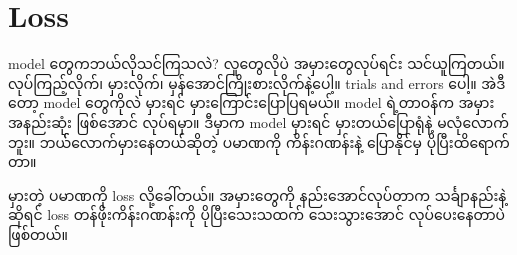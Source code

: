 \section{Loss}

model တွေကဘယ်လိုသင်ကြသလဲ? လူတွေလိုပဲ အမှားတွေလုပ်ရင်း သင်ယူကြတယ်။
လုပ်ကြည့်လိုက်၊ မှားလိုက်၊ မှန်အောင်ကြိုးစားလိုက်နဲ့ပေါ့။ trials and errors ပေါ့။
အဲဒီတော့ model တွေကိုလဲ မှားရင် မှားကြောင်းပြောပြရမယ်။ model ရဲ့တာဝန်က အမှားအနည်းဆုံး
ဖြစ်အောင် လုပ်ရမှာ။ ဒီမှာက model မှားရင် မှားတယ်ပြောရုံနဲ့ မလုံလောက်ဘူး။
ဘယ််လောက်မှားနေတယ်ဆိုတဲ့ ပမာဏကို ကိန်းဂဏန်းနဲ့ ပြောနိုင်မှ ပိုပြီးထိရောက်တာ။

မှားတဲ့ ပမာဏကို loss လို့ခေါ်တယ်။ အမှားတွေကို နည်းအောင်လုပ်တာက သင်္ချာနည်းနဲ့ဆိုရင်
loss တန်ဖိုးကိန်းဂဏန်းကို ပိုပြီးသေးသထက် သေးသွားအောင် လုပ်ပေးနေတာပဲ ဖြစ်တယ်။